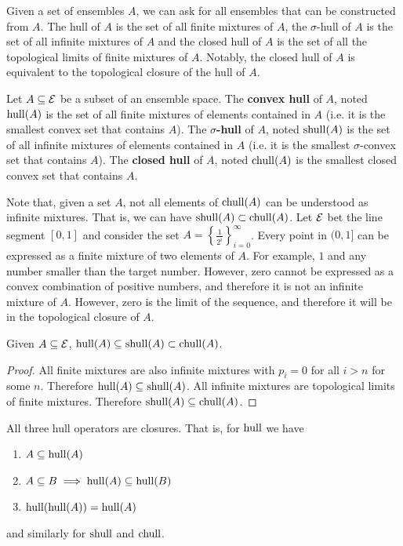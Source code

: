 Given a set of ensembles $A$, we can ask for all ensembles that can be constructed from $A$. The hull of $A$ is the set of all finite mixtures of $A$, the $\sigma$-hull of $A$ is the set of all infinite mixtures of $A$ and the closed hull of $A$ is the set of all the topological limits of finite mixtures of $A$. Notably, the closed hull of $A$ is equivalent to the topological closure of the hull of $A$.

\begin{mathSection}
\begin{defn}
	Let $A \subseteq \mathcal{E}$ be a subset of an ensemble space. The \textbf{convex hull} of $A$, noted $\mathrm{hull}(A)$ is the set of all finite mixtures of elements contained in $A$ (i.e. it is the smallest convex set that contains $A$). The \textbf{$\sigma$-hull} of $A$, noted $\mathrm{shull}(A)$ is the set of all infinite mixtures of elements contained in $A$ (i.e. it is the smallest $\sigma$-convex set that contains $A$). The \textbf{closed hull} of $A$, noted $\mathrm{chull}(A)$ is the smallest closed convex set that contains $A$. 
\end{defn}

\begin{remark}
	Note that, given a set $A$, not all elements of $\mathrm{chull}(A)$ can be understood as infinite mixtures. That is, we can have $\mathrm{shull}(A) \subset \mathrm{chull}(A)$. Let $\mathcal{E}$ bet the line segment $[0,1]$ and consider the set $A=\left\{\frac{1}{2^i}\right\}_{i=0}^{\infty}$. Every point in $(0,1]$ can be expressed as a finite mixture of two elements of $A$. For example, $1$ and any number smaller than the target number. However, zero cannot be expressed as a convex combination of positive numbers, and therefore it is not an infinite mixture of $A$. However, zero is the limit of the sequence, and therefore it will be in the topological closure of $A$.
\end{remark}

\begin{coro}
	Given $A \subseteq \mathcal{E}$, $\mathrm{hull}(A) \subseteq \mathrm{shull}(A) \subset \mathrm{chull}(A)$.
\end{coro}

\begin{proof}
	All finite mixtures are also infinite mixtures with $p_i = 0$ for all $i > n$ for some $n$. Therefore $\mathrm{hull}(A) \subseteq \mathrm{shull}(A)$. All infinite mixtures are topological limits of finite mixtures. Therefore $\mathrm{shull}(A) \subseteq \mathrm{chull}(A)$. 
\end{proof}

\begin{prop}\label{pm_es_hullProp}
	All three hull operators are closures. That is, for $\mathrm{hull}$ we have
	\begin{enumerate}
		\item $A \subseteq \mathrm{hull}(A)$
		\item $A \subseteq B \implies \mathrm{hull}(A) \subseteq \mathrm{hull}(B)$
		\item $\mathrm{hull}(\mathrm{hull}(A)) = \mathrm{hull}(A)$
	\end{enumerate}
	and similarly for $\mathrm{shull}$ and $\mathrm{chull}$.
\end{prop}


\end{mathSection}
